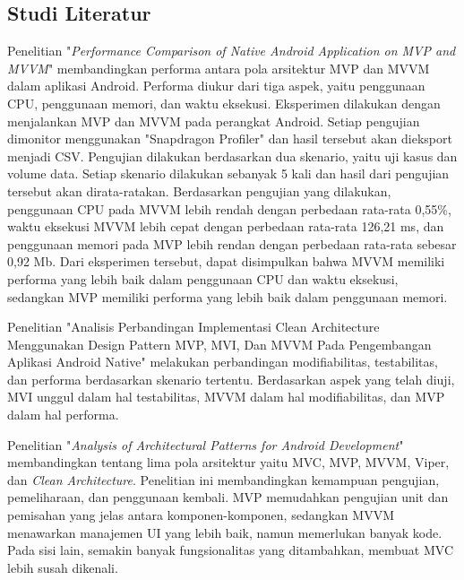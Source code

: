 \documentclass[conference]{IEEEtran}
\begin{document}
	\subsection{Studi Literatur}
	Penelitian "\textit{Performance Comparison of Native Android Application on MVP and MVVM}" \cite{Wis2020} membandingkan performa antara pola arsitektur MVP dan MVVM dalam aplikasi Android. Performa diukur dari tiga aspek, yaitu penggunaan CPU, penggunaan memori, dan waktu eksekusi. Eksperimen dilakukan dengan menjalankan MVP dan MVVM pada perangkat Android. Setiap pengujian dimonitor menggunakan "Snapdragon Profiler" dan hasil tersebut akan dieksport menjadi CSV. Pengujian dilakukan berdasarkan dua skenario, yaitu uji kasus dan volume data. Setiap skenario dilakukan sebanyak 5 kali dan hasil dari pengujian tersebut akan dirata-ratakan. Berdasarkan pengujian yang dilakukan, penggunaan CPU pada MVVM lebih rendah dengan perbedaan rata-rata 0,55\%, waktu eksekusi MVVM lebih cepat dengan perbedaan rata-rata 126,21 ms, dan penggunaan memori pada MVP lebih rendan dengan perbedaan rata-rata sebesar 0,92 Mb. Dari eksperimen tersebut, dapat disimpulkan bahwa MVVM memiliki performa yang lebih baik dalam penggunaan CPU dan waktu eksekusi, sedangkan MVP memiliki performa yang lebih baik dalam penggunaan memori.
 
	Penelitian "Analisis Perbandingan Implementasi Clean Architecture Menggunakan Design Pattern MVP, MVI, Dan MVVM Pada Pengembangan Aplikasi Android Native" \cite{Fir2024} melakukan perbandingan modifiabilitas, testabilitas, dan performa berdasarkan skenario tertentu. Berdasarkan aspek yang telah diuji, MVI unggul dalam hal testabilitas, MVVM dalam hal modifiabilitas, dan MVP dalam hal performa.
 
	Penelitian "\textit{Analysis of Architectural Patterns for Android Development}" \cite{Akh2021} membandingkan tentang lima pola arsitektur yaitu MVC, MVP, MVVM, Viper, dan \textit{Clean Architecture}. Penelitian ini membandingkan kemampuan pengujian, pemeliharaan, dan penggunaan kembali. MVP memudahkan pengujian unit dan pemisahan yang jelas antara komponen-komponen, sedangkan MVVM menawarkan manajemen UI yang lebih baik, namun memerlukan banyak kode. Pada sisi lain, semakin banyak fungsionalitas yang ditambahkan, membuat MVC lebih susah dikenali.
 
\end{document}
